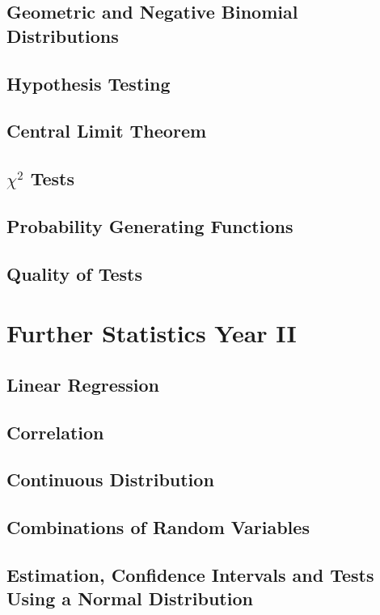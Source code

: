 \documentclass{book}
\begin{document}
    \section{Geometric and Negative Binomial Distributions} \label{}
    \newpage
    \section{Hypothesis Testing} \label{}
    \newpage
    \section{Central Limit Theorem} \label{}
    \newpage
    \section{$\chi^2$ Tests} \label{}
    \newpage
    \section{Probability Generating Functions} \label{}
    \newpage
    \section{Quality of Tests} \label{}
    \newpage

\chapter{Further Statistics Year II} \label{ch:statistics_ii}
    \section{Linear Regression} \label{}
    \newpage
    \section{Correlation} \label{}
    \newpage
    \section{Continuous Distribution} \label{}
    \newpage
    \section{Combinations of Random Variables} \label{}
    \newpage
    \section{Estimation, Confidence Intervals and Tests Using a Normal Distribution} \label{}
    \newpage
\end{document}
